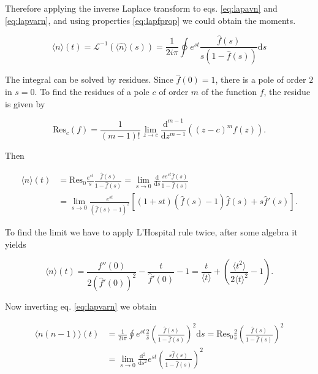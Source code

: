 Therefore applying the inverse Laplace transform to eqs. \eqref{eq:lapavn} and \eqref{eq:lapvarn}, and using properties \eqref{eq:lapfprop} we could obtain the moments. 

\begin{equation}
  \langle n\rangle(t) = \mathcal{L}^{-1}(\langle\hat{n}\rangle(s))=\frac{1}{2i\pi}\oint e^{st}\frac{\hat{f}(s)}{s(1-\hat{f}(s))}\mathrm{d}s
\end{equation}

The integral can be solved by residues. Since $\hat{f}(0)=1$, there is a pole of order $2$ in $s=0$. To find the residues of a pole $c$ of order $m$ of the function $f$, the residue is given by

\begin{equation}
  \label{eq:residues}
  \text{Res}_c(f)=\frac{1}{(m-1)!}\lim_{z\to c}\frac{\mathrm{d}^{m-1}}{\mathrm{d}z^{m-1}}((z-c)^mf(z)).
\end{equation}

Then

\begin{equation*}
  \begin{split}
    \langle n\rangle(t)&=\text{Res}_0\frac{e^{st}}{s}\frac{\hat{f}(s)}{1-\hat{f}(s)}=\lim_{s\to0}\frac{\mathrm{d}}{\mathrm{d}s}\frac{se^{st}\hat{f}(s)}{1-\hat{f}(s)}\\
    & = \lim_{s\to0}\frac{e^{st}}{(\hat{f}(s)-1)^2}\left[(1+st)(\hat{f}(s)-1)\hat{f}(s) + s\hat{f}'(s)\right].
  \end{split}
\end{equation*}

To find the limit we have to apply L'Hospital rule twice, after some algebra it yields

\begin{equation}
  \label{eq:aven}
  \langle n\rangle(t)=\frac{\hat{f}''(0)}{2(\hat{f}'(0))^2}-\frac{t}{\hat{f}'(0)}-1=\frac{t}{\langle t\rangle}+\left(\frac{\langle t^2\rangle}{2\langle t\rangle^2}-1\right).
\end{equation}

Now inverting eq. \eqref{eq:lapvarn} we obtain

\begin{equation*}
  \begin{split}
    \langle n(n-1)\rangle(t)&=\frac{1}{2i\pi}\oint e^{st}\frac{2}{s}\left(\frac{\hat{f}(s)}{1-\hat{f}(s)}\right)^2\mathrm{d}s=\text{Res}_0\frac{2}{s}\left(\frac{\hat{f}(s)}{1-\hat{f}(s)}\right)^2\\
&=\lim_{s\to0}\frac{\mathrm{d}^2}{\mathrm{d}s^2}e^{st}\left(\frac{s\hat{f}(s)}{1-\hat{f}(s)}\right)^2
  \end{split}
\end{equation*}

